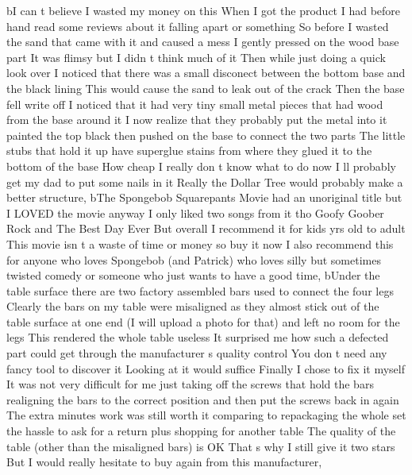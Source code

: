\documentclass[
]{article}
\newenvironment{Shaded}{}{}
\newcommand{\NormalTok}[1]{#1}
\newcommand{\StringTok}[1]{\textcolor[rgb]{0.25,0.44,0.63}{#1}}
\begin{document}
\begin{Shaded}
\begin{Highlighting}[]
\NormalTok{       b}\StringTok{\textquotesingle{}I can t believe I wasted my money on this When I got the product I had before hand read some reviews about it falling apart or something So before I wasted the sand that came with it and caused a mess I gently pressed on the wood base part It was flimsy but I didn t think much of it Then while just doing a quick look over I noticed that there was a small disconect between the bottom base and the black lining This would cause the sand to leak out of the crack Then the base fell write off I noticed that it had very tiny small metal pieces that had wood from the base around it I now realize that they probably put the metal into it painted the top black then pushed on the base to connect the two parts The little stubs that hold it up have superglue stains from where they glued it to the bottom of the base How cheap I really don t know what to do now I ll probably get my dad to put some nails in it Really the Dollar Tree would probably make a better structure\textquotesingle{}}\NormalTok{,}
\NormalTok{       b}\StringTok{\textquotesingle{}The Spongebob Squarepants Movie had an unoriginal title but I LOVED the movie anyway I only liked two songs from it tho Goofy Goober Rock and The Best Day Ever But overall I recommend it for kids yrs old to adult This movie isn t a waste of time or money so buy it now I also recommend this for anyone who loves Spongebob (and Patrick) who loves silly but sometimes twisted comedy or someone who just wants to have a good time\textquotesingle{}}\NormalTok{,}
\NormalTok{       b}\StringTok{\textquotesingle{}Under the table surface there are two factory assembled bars used to connect the four legs Clearly the bars on my table were misaligned as they almost stick out of the table surface at one end (I will upload a photo for that) and left no room for the legs This rendered the whole table useless It surprised me how such a defected part could get through the manufacturer s quality control You don t need any fancy tool to discover it Looking at it would suffice Finally I chose to fix it myself It was not very difficult for me just taking off the screws that hold the bars realigning the bars to the correct position and then put the screws back in again The extra minutes work was still worth it comparing to repackaging the whole set the hassle to ask for a return plus shopping for another table The quality of the table (other than the misaligned bars) is OK That s why I still give it two stars But I would really hesitate to buy again from this manufacturer\textquotesingle{}}\NormalTok{,}

\end{Highlighting}
\end{Shaded}
\end{document}
